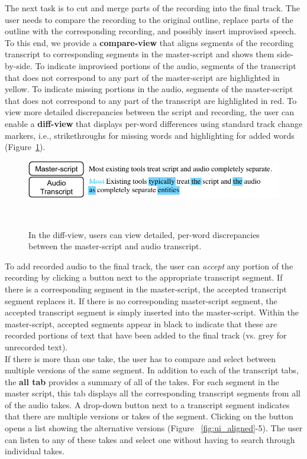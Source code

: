 The next task is to cut and merge parts of the recording into the final track. The user needs to compare the recording to the original outline, replace parts of the outline with the corresponding recording, and possibly insert improvised speech. To this end, we provide a \textbf{compare-view} that aligns segments of the recording transcript to corresponding segments in the master-script and shows them side-by-side. To indicate improvised portions of the audio, segments of the transcript that does not correspond to any part of the master-script are highlighted in yellow. To indicate missing portions in the audio, segments of the master-script that does not correspond to any part of the transcript are highlighted in red. To
view more detailed discrepancies between the script and recording, the
user can enable a \textbf{diff-view} that displays per-word differences
using standard track change markers, i.e., strikethroughs for
missing words and highlighting for added words (Figure~\ref{fig:diffview}).\\
%
\begin{figure}[!h]
\centering
  \includegraphics[width=0.8\columnwidth]{figures/diffview2.pdf}
  \caption{In the diff-view, users can view detailed, per-word discrepancies between the master-script and audio transcript.}~\label{fig:diffview}
\end{figure}
%

To add recorded audio to the final track, the user can \emph{accept} any portion of the recording by clicking a button next to the appropriate transcript segment. If there is a corresponding segment in the master-script, the accepted transcript segment replaces it. If there is no corresponding master-script segment, the accepted transcript segment is simply inserted into the master-script. Within the master-script, accepted segments appear in black to indicate that these are recorded portions of text that have been added to the final track (vs. grey for unrecorded text). \\

If there is more than one take, the user has to compare and select between multiple versions of the same segment. In addition to each of the transcript tabs, the \textbf{all tab} provides a summary of all of the takes. For each segment in the master script, this tab displays all the corresponding transcript segments from all of the audio takes. A drop-down button next to a transcript segment  indicates that there are multiple versions or takes of the  segment. Clicking on the button opens a list showing the alternative versions (Figure ~\ref{fig:ui_aligned}-5). The user can listen to any of these takes and select one without having to search through individual takes. \\

